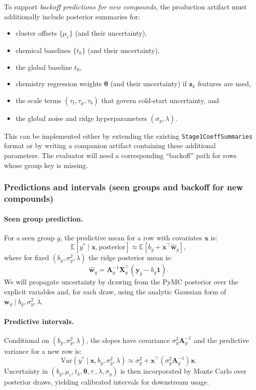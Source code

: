 \documentclass[11pt]{article}
\begin{document}
To support \emph{backoff predictions for new compounds}, the production artifact must additionally include posterior summaries for:
\begin{itemize}
  \item cluster offsets $\{\mu_c\}$ (and their uncertainty),
  \item chemical baselines $\{t_k\}$ (and their uncertainty),
  \item the global baseline $t_0$,
  \item chemistry regression weights $\bm{\theta}$ (and their uncertainty) if $\bm{z}_k$ features are used,
  \item the scale terms $(\tau_t, \tau_\mu, \tau_b)$ that govern cold-start uncertainty, and
  \item the global noise and ridge hyperparameters $(\sigma_y, \lambda)$.
\end{itemize}
This can be implemented either by extending the existing \texttt{Stage1CoeffSummaries} format or by writing a companion artifact
containing these additional parameters. The evaluator will need a corresponding ``backoff'' path for rows whose group key is missing.

\subsubsection{Predictions and intervals (seen groups and backoff for new compounds)}

\paragraph{Seen group prediction.}
For a seen group $g$, the predictive mean for a row with covariates $\bm{x}$ is:
\[
  \mathbb{E}[y^\ast \mid \bm{x}, \text{posterior}] \approx \mathbb{E}\left[b_g + \bm{x}^\top \hat{\bm{w}}_g\right],
\]
where for fixed $(b_g, \sigma_y^2, \lambda)$ the ridge posterior mean is:
\[
  \hat{\bm{w}}_g = \bm{A}_g^{-1}\bm{X}_g^\top(\bm{y}_g - b_g\bm{1}).
\]
We will propagate uncertainty by drawing from the PyMC posterior over the explicit variables and, for each draw, using the analytic
Gaussian form of $\bm{w}_g \mid b_g, \sigma_y^2, \lambda$.

\paragraph{Predictive intervals.}
Conditional on $(b_g, \sigma_y^2, \lambda)$, the slopes have covariance $\sigma_y^2 \bm{A}_g^{-1}$ and the predictive variance for a
new row is:
\[
  \mathrm{Var}(y^\ast \mid \bm{x}, b_g, \sigma_y^2, \lambda)
  \approx \sigma_y^2 + \bm{x}^\top (\sigma_y^2 \bm{A}_g^{-1}) \bm{x}.
\]
Uncertainty in $(b_g, \mu_c, t_k, \bm{\theta}, \tau_\cdot, \lambda, \sigma_y)$ is then incorporated by Monte Carlo over posterior draws,
yielding calibrated intervals for downstream usage.
\end{document}
